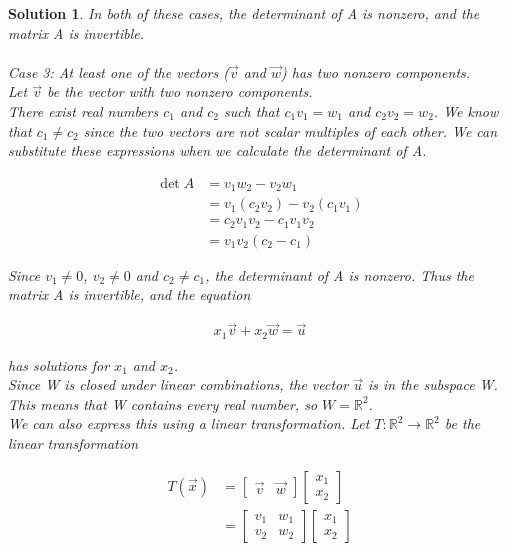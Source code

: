\documentclass{article}
\newtheorem*{solution}{Solution}
\begin{document}
\begin{solution}
In both of these cases, the determinant of A is nonzero, and the matrix A is invertible.
\\ \\
\emph{Case 3: } At least one of the vectors ($\vec{v}$ and $\vec{w}$) has two nonzero components. \\

Let $\vec{v}$ be the vector with two nonzero components. \\

There exist real numbers $c_{1}$ and $c_{2}$ such that $c_{1} v_{1} = w_{1}$ and $c_{2} v_{2} = w_{2}$. We know that $c_{1} \neq c_{2}$ since the two vectors are not scalar multiples of each other. We can substitute these expressions when we calculate the determinant of A.

\begin{align*}
\det A &= v_{1} w_{2} - v_{2} w_{1} \\
&= v_{1} (c_{2} v_{2}) - v_{2} (c_{1} v_{1}) \\
&= c_{2} v_{1} v_{2} - c_{1} v_{1} v_{2} \\
&= v_{1} v_{2}  (c_{2} - c_{1}) 
\end{align*} 

Since $v_{1} \neq 0$, $v_{2} \neq 0$ and $c_{2} \neq c_{1}$, the determinant of A is nonzero. Thus the matrix A is invertible, and the equation 

\begin{align*}
x_{1} \vec{v} + x_{2} \vec{w} = \vec{u}
\end{align*}

has solutions for $x_{1}$ and $x_{2}$. \\

Since W is closed under linear combinations, the vector $\vec{u}$ is in the subspace W. This means that W contains every real number, so $W = \mathbb{R}^2$. \\

We can also express this using a linear transformation. Let $T : \mathbb{R}^2 \to \mathbb{R}^2$ be the linear transformation

\begin{align*}
T(\vec{x}) &= \begin{bmatrix} \vec{v} & \vec{w} \end{bmatrix} \begin{bmatrix} x_{1} \\ x_{2} \end{bmatrix} \\
&= \begin{bmatrix} v_{1} & w_{1} \\ v_{2} & w_{2} \end{bmatrix} \begin{bmatrix} x_{1} \\ x_{2} \end{bmatrix}
\end{align*}


\end{solution}
\end{document}
